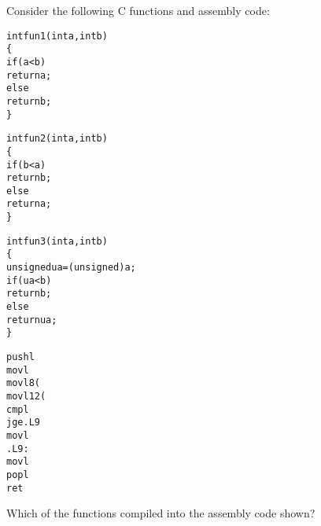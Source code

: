 \begin{problem}{3}
\end{problem}
Consider the following C functions and assembly code:

\vspace{.5ex}

\begin{minipage}{3in}
\begin{ccode}
\begin{alltt}
int fun1(int a, int b)
\verb:{:
    if (a < b)
        return a;
    else
        return b;
\verb:}:
\end{alltt}
\begin{alltt}
int fun2(int a, int b)
\verb:{:
    if (b < a)
        return b;
    else
        return a;
\verb:}:
\end{alltt}
\begin{alltt}
int fun3(int a, int b)
\verb:{:
    unsigned ua = (unsigned) a;
    if (ua < b)
        return b;
    else
        return ua;
\verb:}:
\end{alltt}
\end{ccode}
\end{minipage}
\begin{minipage}{3in}
\begin{scode}
\begin{alltt}
  pushl %ebp{\em\scriptsize }
  movl %esp,%ebp{\em\scriptsize }
  movl 8(%ebp),%edx{\em\scriptsize }
  movl 12(%ebp),%eax{\em\scriptsize }
  cmpl %eax,%edx{\em\scriptsize }
  jge .L9{\em\scriptsize }
  movl %edx,%eax{\em\scriptsize }
.L9:{\em\scriptsize }
  movl %ebp,%esp{\em\scriptsize }
  popl %ebp{\em\scriptsize }
  ret{\em\scriptsize }
\end{alltt}
\end{scode}
\end{minipage}


\vspace{.5ex}

Which of the functions compiled into the assembly code shown?

